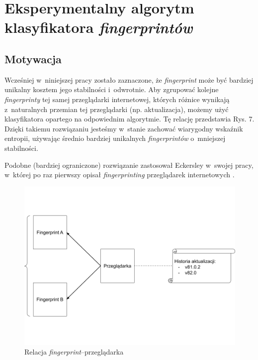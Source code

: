 \chapter{Eksperymentalny algorytm klasyfikatora \emph{fingerprintów}}

\section{Motywacja}
Wcześniej w~niniejszej pracy zostało zaznaczone, że \emph{fingerprint} może być
bardziej unikalny kosztem jego stabilności i~odwrotnie. Aby zgrupować kolejne
\emph{fingerprinty} tej samej przeglądarki internetowej, których różnice
wynikają z~naturalnych przemian tej przeglądarki (np. aktualizacja), możemy użyć
klasyfikatora opartego na odpowiednim algorytmie. Tę relację przedstawia Rys. 7.
Dzięki takiemu rozwiązaniu jesteśmy w~stanie zachować wiarygodny wskaźnik
entropii, używając średnio bardziej unikalnych \emph{fingerprintów} o~mniejszej
stabilności.

Podobne (bardziej ograniczone) rozwiązanie zastosował Eckersley w~swojej pracy,
w~której po raz pierwszy opisał \emph{fingerprinting} przeglądarek internetowych
\cite[s. 13]{eckersley2010unique}.

\begin{figure}
	\includegraphics[width=\textwidth,keepaspectratio]{img/09}
	\caption{Relacja \emph{fingerprint}--przeglądarka}
\end{figure}

